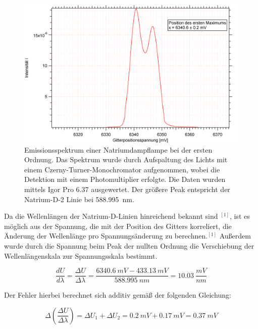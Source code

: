 \begin{figure}[H]
	\centering	
	\begin{minipage}{1\textwidth}
	\includegraphics[width=\columnwidth]{Bilder/Graph2.png}
	\end{minipage}
	
	
	\caption{Emissionsspektrum einer Natriumdampflampe bei der ersten Ordnung. Das Spektrum wurde durch Aufspaltung des Lichts mit einem Czerny-Turner-Monochromator aufgenommen, wobei die Detektion mit einem Photomultiplier erfolgte. Die Daten wurden mittels Igor Pro 6.37 ausgewertet. Der größere Peak entspricht der Natrium-D-2 Linie bei 588.995~\si{nm}.}
	
	
	\label{Eins}
\end{figure}



Da die Wellenlängen der Natrium-D-Linien hinreichend bekannt sind $^{[1]}$, ist es möglich aus der Spannung, die mit der Position des Gitters korreliert, die Änderung der Wellenlänge pro Spannungsänderung zu berechnen.$^{[1]}$ Außerdem wurde durch die Spannung beim Peak der nullten Ordnung die Verschiebung der Wellenlängenskala zur Spannungsskala bestimmt.

\begin {equation}
\frac{dU}{d\lambda}=\frac{\Delta U}{\Delta\lambda}=\frac{6340.6~\si{mV} - 433.13~\si{mV}}{588.995~\si{nm}}=10.03~\si{\frac{mV}{nm}} 
\end {equation}

Der Fehler hierbei berechnet sich additiv gemäß der folgenden Gleichung:

\begin {equation}
\Delta\left(\frac{\Delta U}{\Delta \lambda}\right) = \Delta U_1 + \Delta U_2 = 0.2~\si{mV}+0.17~\si{mV}=0.37~\si{mV}
\end{equation}

